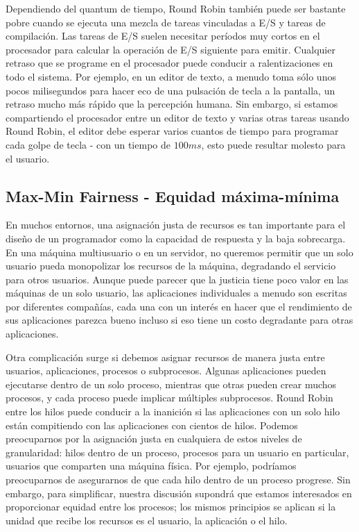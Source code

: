 \documentclass[10pt]{book}
\begin{document}
Dependiendo del quantum de tiempo, Round Robin también puede ser bastante pobre cuando se ejecuta una mezcla de tareas vinculadas a E/S y tareas de compilación. Las tareas de E/S suelen necesitar períodos muy cortos en el procesador para calcular la operación de E/S siguiente para emitir. Cualquier retraso que se programe en el procesador puede conducir a ralentizaciones en todo el sistema. Por ejemplo, en un editor de texto, a menudo toma sólo unos pocos milisegundos para hacer eco de una pulsación de tecla a la pantalla, un retraso mucho más rápido que la percepción humana. Sin embargo, si estamos compartiendo el procesador entre un editor de texto y varias otras tareas usando Round Robin, el editor debe esperar varios cuantos de tiempo para programar cada golpe de tecla - con un tiempo de $100 ms$, esto puede resultar molesto para el usuario.

\subsection{Max-Min Fairness - Equidad máxima-mínima}
En muchos entornos, una asignación justa de recursos es tan importante para el diseño de un programador como la capacidad de respuesta y la baja sobrecarga. En una máquina multiusuario o en un servidor, no queremos permitir que un solo usuario pueda monopolizar los recursos de la máquina, degradando el servicio para otros usuarios. Aunque puede parecer que la justicia tiene poco valor en las máquinas de un solo usuario, las aplicaciones individuales a menudo son escritas por diferentes compañías, cada una con un interés en hacer que el rendimiento de sus aplicaciones parezca bueno incluso si eso tiene un costo degradante para otras aplicaciones.

Otra complicación surge si debemos asignar recursos de manera justa entre usuarios, aplicaciones, procesos o subprocesos. Algunas aplicaciones pueden ejecutarse dentro de un solo proceso, mientras que otras pueden crear muchos procesos, y cada proceso puede implicar múltiples subprocesos. Round Robin entre los hilos puede conducir a la inanición si las aplicaciones con un solo hilo están compitiendo con las aplicaciones con cientos de hilos. Podemos preocuparnos por la asignación justa en cualquiera de estos niveles de granularidad: hilos dentro de un proceso, procesos para un usuario en particular, usuarios que comparten una máquina física. Por ejemplo, podríamos preocuparnos de asegurarnos de que cada hilo dentro de un proceso progrese. Sin embargo, para simplificar, nuestra discusión supondrá que estamos interesados en proporcionar equidad entre los procesos; los mismos principios se aplican si la unidad que recibe los recursos es el usuario, la aplicación o el hilo.
\end{document}
